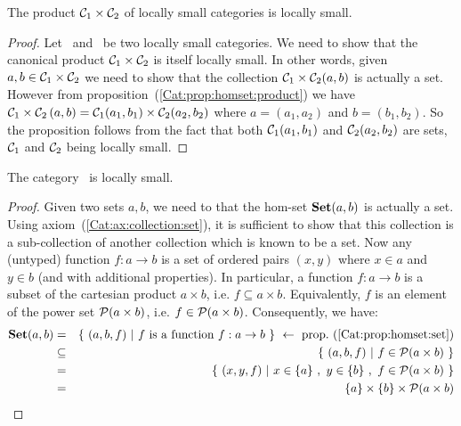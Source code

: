 \begin{prop}\label{Cat:prop:locally:small:product}
    The product $\mbox{${\cal C}_{1}$}\times\mbox{${\cal C}_{2}$}$ of locally small categories
    is locally small.
\end{prop}
\begin{proof}
    Let \Cone\ and \Ctwo\ be two locally small categories. We need to show that
    the canonical product $\mbox{${\cal C}_{1}$}\times\mbox{${\cal C}_{2}$}$ is itself locally small. In other
    words, given $a,b\in\mbox{${\cal C}_{1}$}\times\mbox{${\cal C}_{2}$}$ we need to show that the collection
    $\mbox{${\cal C}_{1}$}\times\mbox{${\cal C}_{2}$}(a,b)$ is actually a set. However from 
    proposition~(\ref{Cat:prop:homset:product}) we have 
    $\mbox{${\cal C}_{1}$}\times\mbox{${\cal C}_{2}$}\,(a,b)=\mbox{${\cal C}_{1}$}(a_{1},b_{1})\times\mbox{${\cal C}_{2}$}(a_{2},b_{2})$
    where $a=(a_{1},a_{2})$ and $b=(b_{1},b_{2})$. So the proposition
    follows from the fact that both $\mbox{${\cal C}_{1}$}(a_{1},b_{1})$ and 
    $\mbox{${\cal C}_{2}$}(a_{2},b_{2})$ are sets, $\mbox{${\cal C}_{1}$}$ and $\mbox{${\cal C}_{2}$}$ being locally 
    small.
\end{proof}
\begin{prop}\label{Cat:prop:locally:small:set}
    The category \Set\ is locally small.
\end{prop}
\begin{proof}
    Given two sets $a,b$, we need to that the hom-set $\mbox{\bf Set}(a,b)$ is 
    actually a set. Using axiom~(\ref{Cat:ax:collection:set}), it
    is sufficient to show that this collection is a sub-collection
    of another collection which is known to be a set. Now any 
    (untyped) function $f:a\to b$ is a set of ordered pairs $(x,y)$
    where $x\in a$ and $y\in b$ (and with additional properties). 
    In particular, a function $f:a\to b$
    is a subset of the cartesian product $a\times b$, i.e.
    $f\subseteq a\times b$. Equivalently, $f$ is an element of
    the power set ${\cal P}(a\times b)$, i.e. 
    $f\in{\cal P}(a\times b)$. Consequently, we have:
        \begin{eqnarray*}\Set(a,b)
            &=&\{\ (a,b,f)\ |\ \mbox{$f$ is a function $f:a\to b$}\ \}
            \ \leftarrow\ \mbox{prop.~(\ref{Cat:prop:homset:set})}\\
            &\subseteq&\{\ (a,b,f)\ |\ f\in{\cal P}(a\times b)\ \}\\
            &=&\{\ (x,y,f)\ |\ x\in\{a\}\ 
            ,\ y\in\{b\}\ ,\ f\in{\cal P}(a\times b)\ \}\\
            &=&\{a\}\times\{b\}\times{\cal P}(a\times b)
        \end{eqnarray*}
\end{proof}
